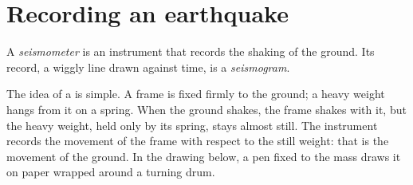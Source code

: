 \section{Recording an earthquake}

\begin{definition}\label{def:g7:earthquakes:seismometer}
A \emph{seismometer} is an instrument that records the
shaking of the ground. Its record, a wiggly line drawn against time, is a
\emph{seismogram}.
\end{definition}

The idea of a  is simple. A frame is fixed firmly to the
ground; a heavy weight hangs from it on a spring. When the ground shakes,
the frame shakes with it, but the heavy weight, held only by its spring,
stays almost still. The instrument records the movement of the frame with
respect to the still weight: that is the movement of the ground. In the
drawing below, a pen fixed to the mass draws it on paper wrapped around a
turning drum.

